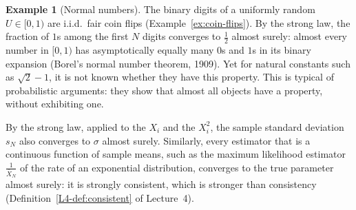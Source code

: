 \documentclass[11pt]{article}
\theoremstyle{definition}
\newtheorem{example}[definition]{Example}
\theoremstyle{plain}
\theoremstyle{remark}
\begin{document}
\begin{example}[Normal numbers]\label{ex:normal-numbers}
    The binary digits of a uniformly random $U \in [0, 1)$ are i.i.d.\ fair coin flips (Example~\ref{ex:coin-flips}). By the strong law, the fraction of $1$s among the first $N$ digits converges to $\frac{1}{2}$ almost surely: almost every number in $[0, 1)$ has asymptotically equally many $0$s and $1$s in its binary expansion (Borel's normal number theorem, 1909). Yet for natural constants such as $\sqrt{2} - 1$, it is not known whether they have this property. This is typical of probabilistic arguments: they show that almost all objects have a property, without exhibiting one.
\end{example}

By the strong law, applied to the $X_i$ and the $X_i^2$, the sample standard deviation $s_N$ also converges to $\sigma$ almost surely. Similarly, every estimator that is a continuous function of sample means, such as the maximum likelihood estimator $\frac{1}{\bar X_N}$ of the rate of an exponential distribution, converges to the true parameter almost surely: it is strongly consistent, which is stronger than consistency (Definition~\ref{L4-def:consistent} of Lecture~4).
\end{document}
